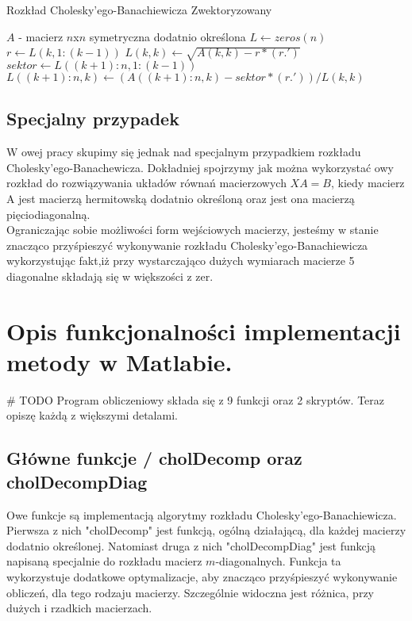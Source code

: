 \documentclass[12pt]{article}
\begin{document}
\begin{algorithm}
\caption{Rozkład Cholesky’ego-Banachiewicza Zwektoryzowany}\label{alg:cap}
\begin{algorithmic}
\Require $A$ - macierz $n$x$n$ symetryczna dodatnio określona 
\Ensure $L \gets zeros(n)$
    \State $r \gets L(k, 1:(k-1))$
    \State $L(k, k) \gets \sqrt{A(k,k) - r * (r.')}$  
    \State $sektor \gets L((k+1):n, 1:(k-1))$
    \State $L((k+1):n,k) \gets (A((k+1):n, k) - sektor * (r.')) / L(k,k)$ 
\EndFor
\end{algorithmic}
\end{algorithm}

\subsection{Specjalny przypadek}

W owej pracy skupimy się jednak nad specjalnym przypadkiem rozkładu Cholesky'ego-Banachewicza. Dokładniej spojrzymy jak można wykorzystać owy rozkład do rozwiązywania układów równań macierzowych $XA = B$, kiedy macierz A jest macierzą hermitowską dodatnio określoną oraz jest ona macierzą pięciodiagonalną.
\\

Ograniczając sobie możliwości form wejściowych macierzy, jesteśmy w stanie znacząco przyśpieszyć wykonywanie rozkładu Cholesky'ego-Banachiewicza wykorzystując fakt,iż przy wystarczająco dużych wymiarach macierze 5 diagonalne składają się w większości z zer.


\section{Opis funkcjonalności implementacji metody w Matlabie.}

# TODO
Program obliczeniowy składa się z 9 funkcji oraz 2 skryptów.
Teraz opiszę każdą z większymi detalami.
\\

\subsection{Główne funkcje / cholDecomp oraz cholDecompDiag}
Owe funkcje są implementacją algorytmy rozkładu Cholesky’ego-Banachiewicza.
Pierwsza z nich "cholDecomp" jest funkcją, ogólną działającą, dla każdej macierzy dodatnio określonej.
Natomiast druga z nich "cholDecompDiag" jest funkcją napisaną specjalnie do rozkładu macierz $m$-diagonalnych. Funkcja ta wykorzystuje dodatkowe optymalizacje, aby znacząco przyśpieszyć wykonywanie obliczeń, dla tego rodzaju macierzy. Szczególnie widoczna jest różnica, przy dużych i rzadkich macierzach. 
\end{document}
